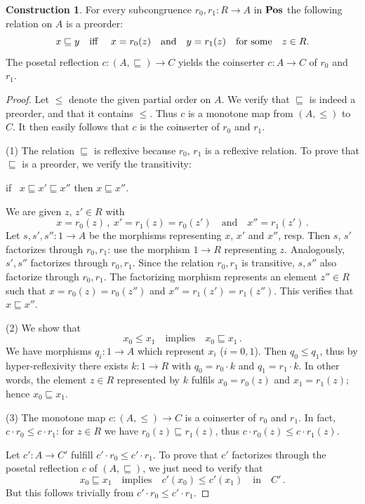 \documentclass[12pt,amstex,leqno]{amsart}
\newcommand\Pos{\operatorname{\bf Pos}}
\theoremstyle{definition}
\newtheorem{constr}[theorem]{Construction}
\numberwithin{equation}{section}
\begin{document}
\begin{constr}\label{C:ref}
For every  subcongruence $r_0, r_1\colon R\to A$ in $\Pos$ the following relation on $A$ is a preorder:
$$
x \sqsubseteq y \mbox{\quad iff \quad} x= r_0(z) \quad \mbox{and}\quad y=r_1(z) \quad \mbox{for some\quad} z\in R.
$$
The posetal reflection $c\colon (A, \sqsubseteq) \to C$ yields the coinserter $c\colon A\to C$ of $r_0$ and $r_1$.
\end{constr}

\begin{proof}
Let $\leq$ denote the given partial order on $A$. We verify that $\sqsubseteq$ is indeed a preorder, and that it contains $\leq$. Thus $c$ is a monotone map from $(A, \leq)$ to $C$. It then easily follows that $c$ is the coinserter of $r_0$ and $r_1$.

(1) The relation $\sqsubseteq$ is reflexive because $r_0$, $r_1$ is a reflexive relation. To prove that $\sqsubseteq$  is a preorder, we verify the transitivity:
\begin{center}
if \ $x\sqsubseteq x' \sqsubseteq x''$ \quad then \quad $x\sqsubseteq x''$.
\end{center}
We are given $z$, $z'\in R$ with
$$
x= r_0(z)\,, \ x'=r_1(z) = r_0(z')\quad \mbox{and}\quad x''=r_1(z')\,.
$$
Let $s, s', s''\colon 1\to A$ be the morphisms representing $x$, $x'$ and $x''$, resp. Then $s$, $s'$ factorizes through $r_0, r_1$: use the morphism $1\to R$ representing  $z$.
Analogously, $s', s''$ factorizes through $r_0, r_1$.
 Since  the relation $r_0, r_1$ is transitive, $s, s''$ also factorize through $r_0, r_1$. The factorizing morphism represents  an element $z''\in R$ such that $x=r_0(z)= r_0(z'')$ and  $x''=r_1(z')= r_1(z'')$. This verifies that $x\sqsubseteq x''$.

(2) We show that
$$
x_0\leq x_1 \quad \mbox{implies}\quad x_0 \sqsubseteq x_1\,.
$$
We have morphisms $q_i \colon 1\to A$ which represent $x_i$ 
($i=0,1$). Then $q_0 \leq q_1$, thus by hyper-reflexivity there exists $k\colon 1\to R$ with  $q_0 = r_0\cdot k$ and $ q_1 = r_1 \cdot k$. In other words, the element $z\in R$ represented by $k$ fulfils $x_0 = r_0(z)$ and $x_1= r_1(z)$; hence $x_0 \sqsubseteq x_1$.


(3) The monotone map $c\colon (A, \leq ) \to C$ is a coinserter of $r_0$ and $r_1$. In fact, $c\cdot r_0 \leq c\cdot r_1$: for $z\in R$ we have  $r_0(z) \sqsubseteq r_1(z)$, thus $c\cdot r_0(z) \leq c \cdot r_1(z)$.

Let $c'\colon A\to C'$ fulfill $c'\cdot r_0 \leq c'\cdot r_1$. To prove that $c'$ factorizes through the posetal reflection $c$ of $(A, \sqsubseteq)$, we just need to verify that
$$
x_0 \sqsubseteq x_1 \quad \mbox{implies}\quad c'(x_0) \leq c'(x_1) \quad \mbox{in}\quad C'\,.
$$
But this follows trivially from $c'\cdot r_0 \leq c'\cdot r_1$.
\end{proof}
\end{document}
